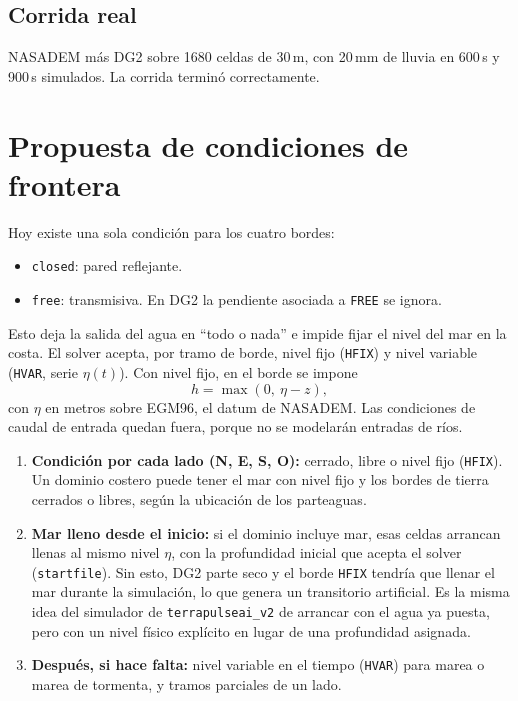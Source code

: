 \documentclass[11pt,a4paper]{article}
\begin{document}
\subsection*{Corrida real}
NASADEM más DG2 sobre 1680 celdas de 30\,m, con 20\,mm de lluvia en 600\,s y 900\,s simulados. La corrida terminó correctamente.

\section{Propuesta de condiciones de frontera}

Hoy existe una sola condición para los cuatro bordes:
\begin{itemize}
  \item \texttt{closed}: pared reflejante.
  \item \texttt{free}: transmisiva. En DG2 la pendiente asociada a \texttt{FREE} se ignora.
\end{itemize}

Esto deja la salida del agua en ``todo o nada'' e impide fijar el nivel del mar en la costa. El solver acepta, por tramo de borde, nivel fijo (\texttt{HFIX}) y nivel variable (\texttt{HVAR}, serie $\eta(t)$). Con nivel fijo, en el borde se impone
\[
  h = \max(0,\ \eta - z),
\]
con $\eta$ en metros sobre EGM96, el datum de NASADEM. Las condiciones de caudal de entrada quedan fuera, porque no se modelarán entradas de ríos.

\begin{enumerate}
  \item \textbf{Condición por cada lado (N, E, S, O):} cerrado, libre o nivel fijo (\texttt{HFIX}). Un dominio costero puede tener el mar con nivel fijo y los bordes de tierra cerrados o libres, según la ubicación de los parteaguas.
  \item \textbf{Mar lleno desde el inicio:} si el dominio incluye mar, esas celdas arrancan llenas al mismo nivel $\eta$, con la profundidad inicial que acepta el solver (\texttt{startfile}). Sin esto, DG2 parte seco y el borde \texttt{HFIX} tendría que llenar el mar durante la simulación, lo que genera un transitorio artificial. Es la misma idea del simulador de \texttt{terrapulseai\_v2} de arrancar con el agua ya puesta, pero con un nivel físico explícito en lugar de una profundidad asignada.
  \item \textbf{Después, si hace falta:} nivel variable en el tiempo (\texttt{HVAR}) para marea o marea de tormenta, y tramos parciales de un lado.
\end{enumerate}
\end{document}
